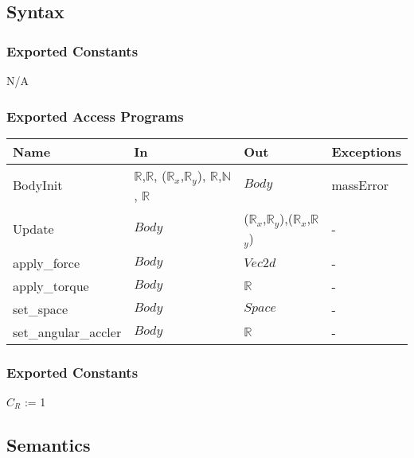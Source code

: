 \documentclass[12pt]{article}
\begin{document}
\subsection{Syntax}

\subsubsection{Exported Constants}

N/A

	
\subsubsection{Exported Access Programs} \label{SecEAPBody}

\begin{center}
	\begin{tabular}{p{4cm} p{4cm} p{4cm} p{2cm}}
		\hline
		\textbf{Name} & \textbf{In} & \textbf{Out} & \textbf{Exceptions} \\
		\hline
		{BodyInit} & $\mathbb{R}$,$\mathbb{R}$, ($\mathbb{R}$$_{x}$,$\mathbb{R}$$_{y}$), $\mathbb{R}$,$\mathbb{N}$, $\mathbb{R}$ & $Body$ & massError \\
		\hline
		{Update} & $Body$ &($\mathbb{R}$$_{x}$,$\mathbb{R}$$_{y}$),($\mathbb{R}$$_{x}$,$\mathbb{R}$$_{y}$) & - \\
		\hline
		{apply\_force} & $Body$  &$Vec2d$& - \\
		\hline
		{apply\_torque} & $Body$  &$\mathbb{R}$& - \\
		\hline
		{set\_space} & $Body$  &$Space$& - \\
		\hline
		{set\_angular\_accler} & $Body$  &$\mathbb{R}$& - \\
		\hline
	\end{tabular}
\end{center}
	
\subsubsection{Exported Constants}
${C_R}$ := 1

\subsection{Semantics}
\end{document}
